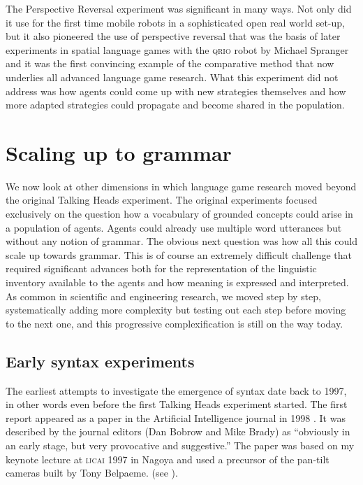 The Perspective Reversal experiment was significant in many ways. Not only did it use for the first time mobile robots in a 
sophisticated open real world set-up, but it also pioneered the use of perspective reversal that was the basis of later 
experiments in spatial language games with the \textsc{qrio} robot by Michael Spranger and it was the first convincing example of 
the comparative method that now underlies all advanced language game research. What this experiment did not address
was how agents could come up with new strategies themselves and how more adapted strategies could propagate and become 
shared in the population. 

\section{Scaling up to grammar}

We now look at other dimensions in which language game research moved beyond the original 
Talking Heads experiment. 
The original experiments focused exclusively
on the question how a vocabulary of grounded concepts could arise in a population 
of agents. Agents could already use multiple word utterances but without any notion of grammar. 
The obvious next question was how all this could scale up towards grammar. This is of course an extremely difficult
challenge that required significant advances both for the representation of the linguistic inventory 
available to the agents and how meaning is expressed and interpreted. As common in 
scientific and engineering research, we moved step by step, systematically adding more complexity but 
testing out each step before moving to the next one, and this progressive complexification is still on the way today.

\subsection{Early syntax experiments}

The earliest attempts to investigate the emergence of syntax date back to 1997, in other words even before 
the first Talking Heads experiment started. The first report 
appeared as a paper in the Artificial Intelligence journal in 1998 \citep{Steels:1998}. 
It was described by the journal editors (Dan Bobrow and 
Mike Brady) as ``obviously in an early stage, but very provocative and suggestive.'' The paper was based on my keynote 
lecture at \textsc{ijcai} 1997 in Nagoya and used a precursor of the pan-tilt cameras built by Tony Belpaeme. 
(see ). 

